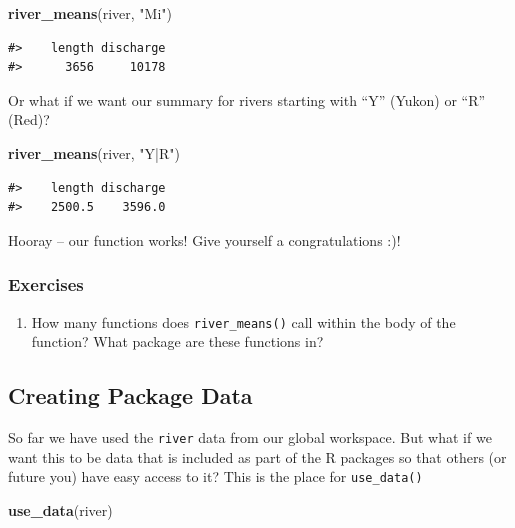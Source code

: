 \documentclass[
]{book}
\newenvironment{Shaded}{\begin{snugshade}}{\end{snugshade}}
\newcommand{\KeywordTok}[1]{\textcolor[rgb]{0.13,0.29,0.53}{\textbf{#1}}}
\newcommand{\NormalTok}[1]{#1}
\newcommand{\StringTok}[1]{\textcolor[rgb]{0.31,0.60,0.02}{#1}}
\providecommand{\tightlist}{%
  \setlength{\itemsep}{0pt}\setlength{\parskip}{0pt}}
\begin{document}
\begin{Shaded}
\begin{Highlighting}[]
\KeywordTok{river_means}\NormalTok{(river, }\StringTok{"Mi"}\NormalTok{)}
\end{Highlighting}
\end{Shaded}

\begin{verbatim}
#>    length discharge 
#>      3656     10178
\end{verbatim}

Or what if we want our summary for rivers starting with ``Y'' (Yukon) or ``R'' (Red)?

\begin{Shaded}
\begin{Highlighting}[]
\KeywordTok{river_means}\NormalTok{(river, }\StringTok{"Y|R"}\NormalTok{)}
\end{Highlighting}
\end{Shaded}

\begin{verbatim}
#>    length discharge 
#>    2500.5    3596.0
\end{verbatim}

Hooray -- our function works! Give yourself a congratulations :)!

\hypertarget{exercises-1}{%
\subsubsection{Exercises}\label{exercises-1}}

\begin{enumerate}
\def\labelenumi{\arabic{enumi}.}
\tightlist
\item
  How many functions does \texttt{river\_means()} call within the body of the function? What package are these functions in?
\end{enumerate}

\hypertarget{creating-package-data}{%
\subsection{Creating Package Data}\label{creating-package-data}}

So far we have used the \texttt{river} data from our global workspace. But what if we want this to be data that is included as part of the R packages so that others (or future you) have easy access to it? This is the place for \texttt{use\_data()}

\begin{Shaded}
\begin{Highlighting}[]
\KeywordTok{use_data}\NormalTok{(river)}
\end{Highlighting}
\end{Shaded}
\end{document}
